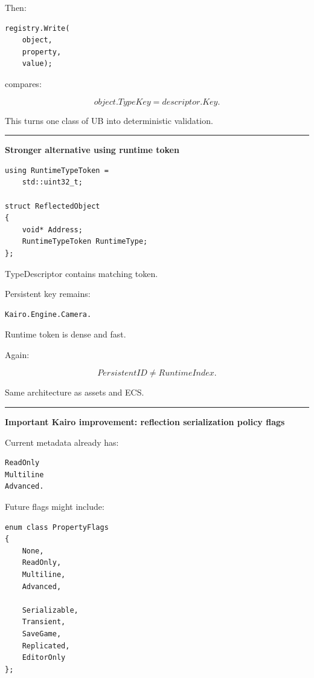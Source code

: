 Then:

\begin{verbatim}
registry.Write(
    object,
    property,
    value);
\end{verbatim}

compares:

\[
object.TypeKey=
descriptor.Key.
\]

This turns one class of UB into deterministic validation.

\begin{center}\rule{0.5\linewidth}{0.5pt}\end{center}

\textbf{Stronger alternative using runtime token}

\begin{verbatim}
using RuntimeTypeToken =
    std::uint32_t;

struct ReflectedObject
{
    void* Address;
    RuntimeTypeToken RuntimeType;
};
\end{verbatim}

TypeDescriptor contains matching token.

Persistent key remains:

\begin{verbatim}
Kairo.Engine.Camera.
\end{verbatim}

Runtime token is dense and fast.

Again:

\[
PersistentID
\neq
RuntimeIndex.
\]

Same architecture as assets and ECS.

\begin{center}\rule{0.5\linewidth}{0.5pt}\end{center}

\textbf{Important Kairo improvement: reflection serialization policy flags}

Current metadata already has:

\begin{verbatim}
ReadOnly
Multiline
Advanced.
\end{verbatim}

Future flags might include:

\begin{verbatim}
enum class PropertyFlags
{
    None,
    ReadOnly,
    Multiline,
    Advanced,

    Serializable,
    Transient,
    SaveGame,
    Replicated,
    EditorOnly
};
\end{verbatim}

